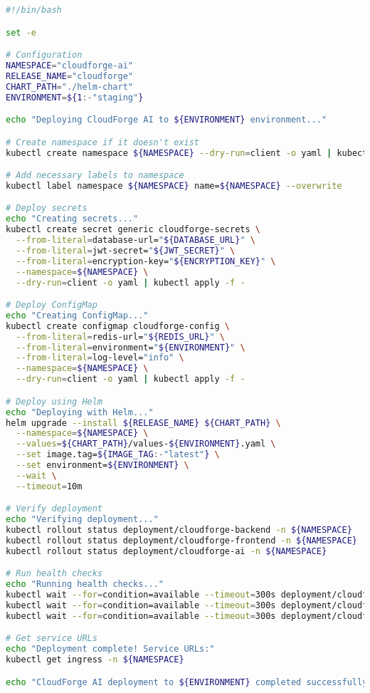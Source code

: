 \begin{lstlisting}[language=bash]
#!/bin/bash

set -e

# Configuration
NAMESPACE="cloudforge-ai"
RELEASE_NAME="cloudforge"
CHART_PATH="./helm-chart"
ENVIRONMENT=${1:-"staging"}

echo "Deploying CloudForge AI to ${ENVIRONMENT} environment..."

# Create namespace if it doesn't exist
kubectl create namespace ${NAMESPACE} --dry-run=client -o yaml | kubectl apply -f -

# Add necessary labels to namespace
kubectl label namespace ${NAMESPACE} name=${NAMESPACE} --overwrite

# Deploy secrets
echo "Creating secrets..."
kubectl create secret generic cloudforge-secrets \
  --from-literal=database-url="${DATABASE_URL}" \
  --from-literal=jwt-secret="${JWT_SECRET}" \
  --from-literal=encryption-key="${ENCRYPTION_KEY}" \
  --namespace=${NAMESPACE} \
  --dry-run=client -o yaml | kubectl apply -f -

# Deploy ConfigMap
echo "Creating ConfigMap..."
kubectl create configmap cloudforge-config \
  --from-literal=redis-url="${REDIS_URL}" \
  --from-literal=environment="${ENVIRONMENT}" \
  --from-literal=log-level="info" \
  --namespace=${NAMESPACE} \
  --dry-run=client -o yaml | kubectl apply -f -

# Deploy using Helm
echo "Deploying with Helm..."
helm upgrade --install ${RELEASE_NAME} ${CHART_PATH} \
  --namespace=${NAMESPACE} \
  --values=${CHART_PATH}/values-${ENVIRONMENT}.yaml \
  --set image.tag=${IMAGE_TAG:-"latest"} \
  --set environment=${ENVIRONMENT} \
  --wait \
  --timeout=10m

# Verify deployment
echo "Verifying deployment..."
kubectl rollout status deployment/cloudforge-backend -n ${NAMESPACE}
kubectl rollout status deployment/cloudforge-frontend -n ${NAMESPACE}
kubectl rollout status deployment/cloudforge-ai -n ${NAMESPACE}

# Run health checks
echo "Running health checks..."
kubectl wait --for=condition=available --timeout=300s deployment/cloudforge-backend -n ${NAMESPACE}
kubectl wait --for=condition=available --timeout=300s deployment/cloudforge-frontend -n ${NAMESPACE}
kubectl wait --for=condition=available --timeout=300s deployment/cloudforge-ai -n ${NAMESPACE}

# Get service URLs
echo "Deployment complete! Service URLs:"
kubectl get ingress -n ${NAMESPACE}

echo "CloudForge AI deployment to ${ENVIRONMENT} completed successfully!"
\end{lstlisting}

